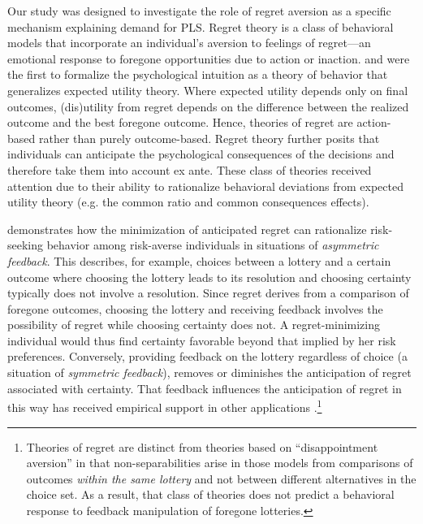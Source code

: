 \documentclass[12pt]{article}
\begin{document}
		Our study was designed to investigate the role of regret aversion as a specific mechanism explaining demand for PLS. Regret theory is a class of behavioral models that incorporate an individual's aversion to feelings of regret---an emotional response to foregone opportunities due to action or inaction. \textcite{bell_risk_1983} and \textcite{loomes_regret_1982} were the first to formalize the psychological intuition as a theory of behavior that generalizes expected utility theory. Where expected utility depends only on final outcomes, (dis)utility from regret depends on the difference between the realized outcome and the best foregone outcome. Hence, theories of regret are action-based rather than purely outcome-based. Regret theory further posits that individuals can anticipate the psychological consequences of the decisions and therefore take them into account ex ante. These class of theories received attention due to their ability to rationalize behavioral deviations from expected utility theory (e.g. the common ratio and common consequences effects).

		\textcite{zeelenberg_consequences_1996} demonstrates how the minimization of anticipated regret can rationalize risk-seeking behavior among risk-averse individuals in situations of \emph{asymmetric feedback}. This describes, for example, choices between a lottery and a certain outcome where choosing the lottery leads to its resolution and choosing certainty typically does not involve a resolution. Since regret derives from a comparison of foregone outcomes, choosing the lottery and receiving feedback involves the possibility of regret while choosing certainty does not. A regret-minimizing individual would thus find certainty favorable beyond that implied by her risk preferences. Conversely, providing feedback on the lottery regardless of choice (a situation of \emph{symmetric feedback}), removes or diminishes the anticipation of regret associated with certainty. That feedback influences the anticipation of regret in this way has received empirical support in other applications \parencite{somasundaram_regret_2017,filiz-ozbay_auctions_2007,zeelenberg_consequences_2004}.\footnote{Theories of regret are distinct from theories based on ``disappointment aversion'' \parencite{gul_theory_1991} in that non-separabilities arise in those models from comparisons of outcomes \emph{within the same lottery} and not between different alternatives in the choice set. As a result, that class of theories does not predict a behavioral response to feedback manipulation of foregone lotteries.}
\end{document}
